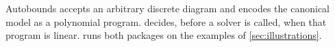 Autobounds accepts an arbitrary discrete diagram and encodes the canonical
model as a polynomial program.  decides, before a solver is
called, when that program is linear.  runs both packages
on the examples of \cref{sec:illustrations}.



\clearpage
